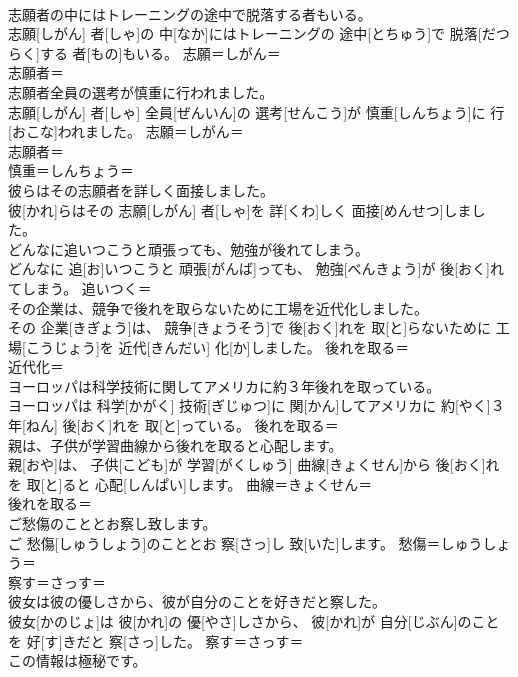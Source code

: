 \documentclass[8pt]{extreport}
\begin{document}
\begin{CJK}{UTF8}{min}
\\	志願者の中にはトレーニングの途中で脱落する者もいる。	
\\	志願[しがん] 者[しゃ]の 中[なか]にはトレーニングの 途中[とちゅう]で 脱落[だつらく]する 者[もの]もいる。	志願＝しがん＝ 
\\	志願者＝ 
\\	志願者全員の選考が慎重に行われました。	
\\	志願[しがん] 者[しゃ] 全員[ぜんいん]の 選考[せんこう]が 慎重[しんちょう]に 行[おこな]われました。	志願＝しがん＝ 
\\	志願者＝ 
\\	慎重＝しんちょう＝ 
\\	彼らはその志願者を詳しく面接しました。	
\\	彼[かれ]らはその 志願[しがん] 者[しゃ]を 詳[くわ]しく 面接[めんせつ]しました。	
\\	どんなに追いつこうと頑張っても、勉強が後れてしまう。	
\\	どんなに 追[お]いつこうと 頑張[がんば]っても、 勉強[べんきょう]が 後[おく]れてしまう。	追いつく＝ 
\\	その企業は、競争で後れを取らないために工場を近代化しました。	
\\	その 企業[きぎょう]は、 競争[きょうそう]で 後[おく]れを 取[と]らないために 工場[こうじょう]を 近代[きんだい] 化[か]しました。	後れを取る＝ 
\\	近代化＝ 
\\	ヨーロッパは科学技術に関してアメリカに約３年後れを取っている。	
\\	ヨーロッパは 科学[かがく] 技術[ぎじゅつ]に 関[かん]してアメリカに 約[やく]３ 年[ねん] 後[おく]れを 取[と]っている。	後れを取る＝ 
\\	親は、子供が学習曲線から後れを取ると心配します。	
\\	親[おや]は、 子供[こども]が 学習[がくしゅう] 曲線[きょくせん]から 後[おく]れを 取[と]ると 心配[しんぱい]します。	曲線＝きょくせん＝ 
\\	後れを取る＝ 
\\	ご愁傷のこととお察し致します。	
\\	ご 愁傷[しゅうしょう]のこととお 察[さっ]し 致[いた]します。	愁傷＝しゅうしょう＝ 
\\	察す＝さっす＝ 
\\	彼女は彼の優しさから、彼が自分のことを好きだと察した。	
\\	彼女[かのじょ]は 彼[かれ]の 優[やさ]しさから、 彼[かれ]が 自分[じぶん]のことを 好[す]きだと 察[さっ]した。	察す＝さっす＝ 
\\	この情報は極秘です。	

\end{CJK}
\end{document}
